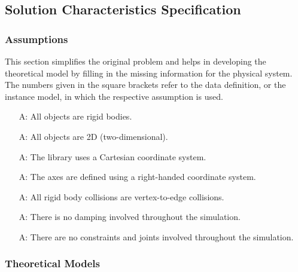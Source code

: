 \documentclass[12pt]{article}
\newcounter{assumpnum} %
\begin{document}
\subsection{Solution Characteristics Specification}

\subsubsection{Assumptions}
This section simplifies the original problem and helps in developing the
theoretical model by filling in the missing information for the physical
system. The numbers given in the square brackets refer to the data definition,
or the instance model, in which the respective assumption is used.

\begin{itemize}
\item [A\refstepcounter{assumpnum}\theassumpnum \label{A_rigid}:] All objects are rigid bodies.

\item [A\refstepcounter{assumpnum}\theassumpnum \label{A_2d}:] All objects are 2D (two-dimensional).

\item[A\refstepcounter{assumpnum}\theassumpnum \label{A_cartesian}:]  The library uses a Cartesian coordinate system.

\item[A\refstepcounter{assumpnum}\theassumpnum \label{A_right}:] The axes are defined using a right-handed coordinate system.

\item[A\refstepcounter{assumpnum}\theassumpnum \label{A_col}:] All rigid body collisions are vertex-to-edge collisions.

\item[A\refstepcounter{assumpnum}\theassumpnum \label{A_damping}:] There is no damping involved throughout the simulation.

\item[A\refstepcounter{assumpnum}\theassumpnum \label{A_constraints}:] There are no constraints and joints involved throughout the simulation.

\end{itemize}

\subsubsection{Theoretical Models}\label{sec_theoretical}
\end{document}
